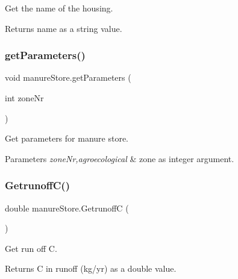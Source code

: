 Get the name of the housing. 

\begin{DoxyReturn}{Returns}
name as a string value. 
\end{DoxyReturn}
\mbox{\label{classmanure_store_acc4d7b113dd3294a798a4c57df282ccd}} 
\subsubsection{\texorpdfstring{getParameters()}{getParameters()}}
{\footnotesize\ttfamily void manure\+Store.\+get\+Parameters (\begin{DoxyParamCaption}\item[{int}]{zone\+Nr }\end{DoxyParamCaption})\hspace{0.3cm}{\ttfamily [inline]}}



Get parameters for manure store. 


\begin{DoxyParams}{Parameters}
{\em zone\+Nr,agroecological} & zone as integer argument. \\
\hline
\end{DoxyParams}
\mbox{\label{classmanure_store_aa996a044259ad5c54695a89f404d671a}} 
\subsubsection{\texorpdfstring{GetrunoffC()}{GetrunoffC()}}
{\footnotesize\ttfamily double manure\+Store.\+GetrunoffC (\begin{DoxyParamCaption}{ }\end{DoxyParamCaption})\hspace{0.3cm}{\ttfamily [inline]}}



Get run off C. 

\begin{DoxyReturn}{Returns}
C in runoff (kg/yr) as a double value. 
\end{DoxyReturn}
\mbox{\label{classmanure_store_ac69d09e89778d0b12e1b8d77542a8539}} 
